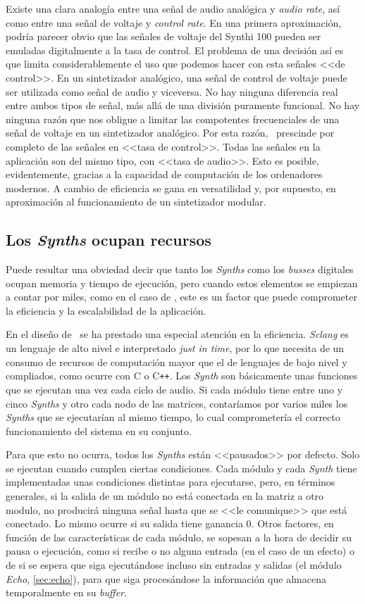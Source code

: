 Existe una clara analogía entre una señal de audio analógica y \textit{audio rate}, así como entre una señal de voltaje y \textit{control rate}. En una primera aproximación, podría parecer obvio que las señales de voltaje del Synthi 100 pueden ser emuladas digitalmente a la tasa de control. El problema de una decisión así es que limita considerablemente el uso que podemos hacer con esta señales <<de control>>. En un sintetizador analógico, una señal de control de voltaje puede ser utilizada como señal de audio y viceversa. No hay ninguna diferencia real entre ambos tipos de señal, más allá de una división puramente funcional. No hay ninguna razón que nos obligue a limitar las compotentes frecuenciales de una señal de voltaje en un sintetizador analógico. Por esta razón, \appName\ prescinde por completo de las señales en <<tasa de control>>. Todas las señales en la aplicación son del mismo tipo, con <<tasa de audio>>. Esto es posible, evidentemente, gracias a la capacidad de computación de los ordenadores modernos. A cambio de eficiencia se gana en versatilidad y, por supuesto, en aproximación al funcionamiento de un sintetizador modular.


\subsection{Los \textit{Synths} ocupan recursos}
Puede resultar una obviedad decir que tanto los \textit{Synths} como los \textit{busses} digitales ocupan memoria y tiempo de ejecución, pero cuando estos elementos se empiezan a contar por miles, como en el caso de \appName, este es un factor que puede comprometer la eficiencia y la escalabilidad de la aplicación.

En el diseño de \appName~se ha prestado una especial atención en la eficiencia. \textit{Sclang} es un lenguaje de alto nivel e interpretado \textit{just in time}, por lo que necesita de un consumo de recursos de computación mayor que el de lenguajes de bajo nivel y compliados, como ocurre con C o C\texttt{++}. Los \textit{Synth} son básicamente unas funciones que se ejecutan una vez cada ciclo de audio. Si cada módulo tiene entre uno y cinco \textit{Synths} y otro cada nodo de las matrices, contaríamos por varios miles los \textit{Synths} que se ejecutarían al mismo tiempo, lo cual comprometería el correcto funcionamiento del sistema en su conjunto.

Para que esto no ocurra, todos los \textit{Synths} están <<pausados>> por defecto. Solo se ejecutan cuando cumplen ciertas condiciones. Cada módulo y cada \textit{Synth} tiene implementadas unas condiciones distintas para ejecutarse, pero, en términos generales, si la salida de un módulo no está conectada en la matriz a otro modulo, no producirá ninguna señal hasta que se <<le comunique>> que está conectado. Lo mismo ocurre si su salida tiene ganancia $0$. Otros factores, en función de las características de cada módulo, se sopesan a la hora de decidir su pausa o ejecución, como si recibe o no alguna entrada (en el caso de un efecto) o de si se espera que siga ejecutándose incluso sin entradas y salidas (el módulo \textit{Echo}, \ref{sec:echo}), para que siga procesándose la información que almacena temporalmente en su \textit{buffer}. 


